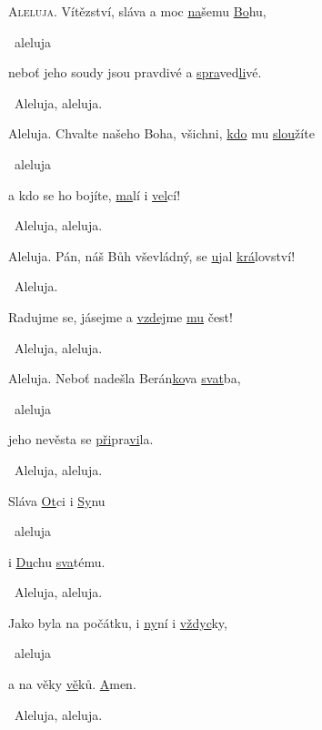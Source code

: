 \begin{psalmus}

\setlength{\parindent}{0pt}

\lettrine{A}{leluja.}
Vítězství, sláva a moc \underline{na}\-še\-mu \underline{Bo}\-hu,

~aleluja

neboť jeho soudy jsou pravdivé a \underline{spra}\-ved\-\underline{li}\-vé.

~Aleluja, aleluja.\vspace{2mm}

Aleluja.
Chvalte našeho Boha, všichni, \underline{kdo} mu \underline{slou}\-ží\-te

~aleluja

a kdo se ho bojíte, \underline{ma}\-lí i \underline{vel}\-cí!

~Aleluja, aleluja.\vspace{2mm}

Aleluja.
Pán, náš Bůh vševládný, se \underline{u}\-jal \underline{krá}\-lov\-ství!

~Aleluja.

Radujme se, jásejme a \underline{vzdej}\-me \underline{mu} čest!

~Aleluja, aleluja.\vspace{2mm}

Aleluja.
Neboť nadešla Be\-rán\-\underline{ko}\-va \underline{svat}\-ba,

~aleluja

jeho nevěsta se \underline{při}\-pra\-\underline{vi}\-la.

~Aleluja, aleluja.\vspace{2mm}

Sláva \underline{Ot}\-ci i \underline{Sy}\-nu

~aleluja

i \underline{Du}\-chu \underline{sva}\-té\-mu.

~Aleluja, aleluja.\vspace{2mm}

Jako byla na počátku, i \underline{ny}\-ní i \underline{vždyc}\-ky,

~aleluja

a na věky \underline{vě}\-ků. \underline{A}\-men.

~Aleluja, aleluja.
\end{psalmus}
